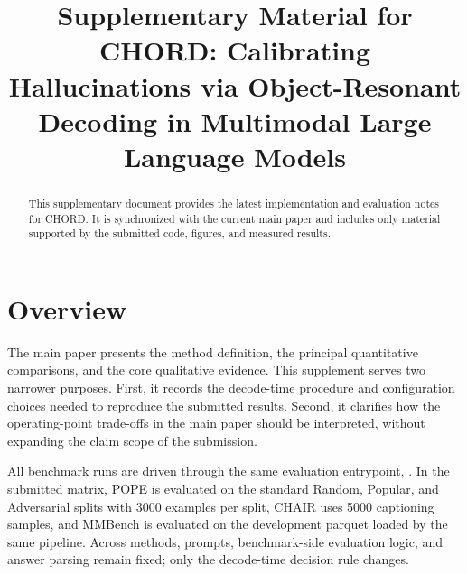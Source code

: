 \documentclass[sigconf,anonymous,nonacm]{acmart}
\begin{document}
\title{Supplementary Material for CHORD: Calibrating Hallucinations via Object-Resonant Decoding in Multimodal Large Language Models}

%

\renewcommand{\shortauthors}{Anonymous Submission}

\begin{abstract}
This supplementary document provides the latest implementation and evaluation notes for CHORD. It is synchronized with the current main paper and includes only material supported by the submitted code, figures, and measured results.
\end{abstract}

\maketitle

\section{Overview}

The main paper presents the method definition, the principal quantitative comparisons, and the core qualitative evidence. This supplement serves two narrower purposes. First, it records the decode-time procedure and configuration choices needed to reproduce the submitted results. Second, it clarifies how the operating-point trade-offs in the main paper should be interpreted, without expanding the claim scope of the submission.

All benchmark runs are driven through the same evaluation entrypoint, . In the submitted matrix, POPE is evaluated on the standard Random, Popular, and Adversarial splits with 3000 examples per split, CHAIR uses 5000 captioning samples, and MMBench is evaluated on the development parquet loaded by the same pipeline. Across methods, prompts, benchmark-side evaluation logic, and answer parsing remain fixed; only the decode-time decision rule changes.
\end{document}
